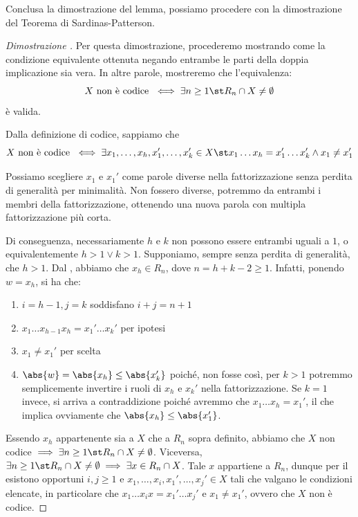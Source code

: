 Conclusa la dimostrazione del lemma, possiamo procedere con la dimostrazione del Teorema di Sardinas-Patterson.
\begin{proof}[Dimostrazione ]
  Per questa dimostrazione, procederemo mostrando come la condizione equivalente ottenuta negando entrambe le parti della doppia implicazione sia vera.
  In altre parole, mostreremo che l'equivalenza:
  \[X \text{ non è codice } \iff \exists n \geq 1 \st R_n \cap X \neq \emptyset\]
  è valida.

  Dalla definizione di codice, sappiamo che 
  \[X \text{ non è codice } \iff \exists x_1, \ldots, x_h,x_1',\ldots,x_k' \in X \st x_1\ldots x_h = x_1'\ldots x_k' \land x_1 \neq x_1'\]
  
  Possiamo scegliere \(x_1\) e \(x_1'\) come parole diverse nella fattorizzazione senza perdita di generalità per minimalità.
  Non fossero diverse, potremmo  da entrambi i membri della fattorizzazione, ottenendo una nuova parola con multipla fattorizzazione più corta.
  
  Di conseguenza, necessariamente \(h\) e \(k\) non possono essere entrambi uguali a \(1\), o equivalentemente \(h>1 \lor k>1\).
  Supponiamo, sempre senza perdita di generalità, che \(h>1\).
  Dal , abbiamo che \(x_h \in R_n\), dove \(n = h + k - 2 \geq 1\).
  Infatti, ponendo \(w = x_h\), si ha che:
  \begin{enumerate}
    \item \(i = h - 1, j = k\) soddisfano \(i + j = n + 1\)
    \item \(x_1\ldots x_{h-1} x_h = x_1'\ldots x_k'\) per ipotesi
    \item \(x_1 \neq x_1'\) per scelta
    \item \(\abs{w} = \abs{x_h} \leq \abs{x_k'}\) poiché, non fosse così, per \(k>1\) potremmo semplicemente invertire i ruoli di \(x_h\) e \(x_k'\) nella fattorizzazione.
          Se \(k=1\) invece, si arriva a contraddizione poiché avremmo che \(x_1\ldots x_h = x_1'\), il che implica ovviamente che \(\abs{x_h} \leq \abs{x_1'}\).
  \end{enumerate}
  Essendo \(x_h\) appartenente sia a \(X\) che a \(R_n\) sopra definito, abbiamo che \(X\) non codice \(\implies \exists n \geq 1 \st R_n \cap X \neq \emptyset\).
  Viceversa, \(\exists n \geq 1 \st R_n \cap X \neq \emptyset \implies \exists x \in R_n \cap X\).
  Tale \(x\) appartiene a \(R_n\), dunque per il  esistono opportuni \(i,j \geq 1\) e \(x_1,\ldots,x_i,x_1',\ldots,x_j' \in X\) tali che valgano le condizioni elencate, in particolare che \(x_1\ldots x_i x = x_1'\ldots x_j'\) e \(x_1 \neq x_1'\), ovvero che \(X\) non è codice.
\end{proof}

